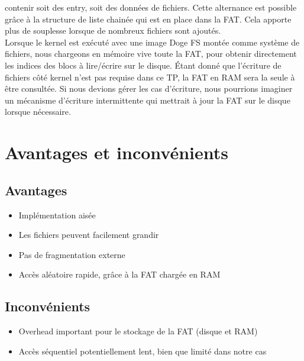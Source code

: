 \documentclass[a4paper, 12pt]{article}
\begin{document}
contenir soit des entry, soit des données de fichiers. Cette alternance est possible grâce à la structure 
de liste chainée qui est en place dans la FAT. Cela apporte plus de souplesse lorsque de nombreux fichiers 
sont ajoutés.
\\
Lorsque le kernel est exécuté avec une image Doge FS montée comme système de fichiers, nous chargeons en 
mémoire vive toute la FAT, pour obtenir directement les indices des blocs à lire/écrire sur le disque. Étant 
donné que l'écriture de fichiers côté kernel n'est pas requise dans ce TP, la FAT en RAM sera la seule à être 
consultée. Si nous devions gérer les cas d'écriture, nous pourrions imaginer un mécanisme d'écriture intermittente
qui mettrait à jour la FAT sur le disque lorsque nécessaire.


\newpage
\section{Avantages et inconvénients}
\subsection{Avantages}
\begin{itemize}
	\item Implémentation aisée
	\item Les fichiers peuvent facilement grandir
	\item Pas de fragmentation externe
	\item Accès aléatoire rapide, grâce à la FAT chargée en RAM
\end{itemize}
\subsection{Inconvénients}
\begin{itemize}
	\item Overhead important pour le stockage de la FAT (disque et RAM)
	\item Accès séquentiel potentiellement lent, bien que limité dans notre cas
\end{itemize}
\end{document}
